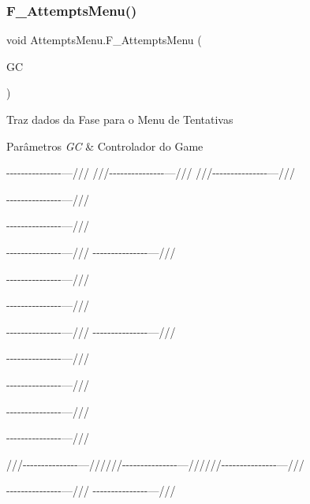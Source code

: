 \mbox{\label{class_attempts_menu_ab12fb99ad5bccf9f8367ef71e17af628}} 
\subsubsection{F\_AttemptsMenu()}
{\footnotesize\ttfamily void Attempts\+Menu.\+F\+\_\+\+Attempts\+Menu (\begin{DoxyParamCaption}\item[{\textbf{ Game\+Controller}}]{GC }\end{DoxyParamCaption})}



Traz dados da Fase para o Menu de Tentativas 


\begin{DoxyParams}{Parâmetros}
{\em GC} & Controlador do Game\\
\hline
\end{DoxyParams}
-\/-\/-\/-\/-\/-\/-\/-\/-\/-\/-\/-\/-\/-\/-\/---/// ///-\/-\/-\/-\/-\/-\/-\/-\/-\/-\/-\/-\/-\/-\/-\/---/// ///-\/-\/-\/-\/-\/-\/-\/-\/-\/-\/-\/-\/-\/-\/-\/---///

-\/-\/-\/-\/-\/-\/-\/-\/-\/-\/-\/-\/-\/-\/-\/---///

-\/-\/-\/-\/-\/-\/-\/-\/-\/-\/-\/-\/-\/-\/-\/---///

-\/-\/-\/-\/-\/-\/-\/-\/-\/-\/-\/-\/-\/-\/-\/---/// -\/-\/-\/-\/-\/-\/-\/-\/-\/-\/-\/-\/-\/-\/-\/---///

-\/-\/-\/-\/-\/-\/-\/-\/-\/-\/-\/-\/-\/-\/-\/---///

-\/-\/-\/-\/-\/-\/-\/-\/-\/-\/-\/-\/-\/-\/-\/---///

-\/-\/-\/-\/-\/-\/-\/-\/-\/-\/-\/-\/-\/-\/-\/---/// -\/-\/-\/-\/-\/-\/-\/-\/-\/-\/-\/-\/-\/-\/-\/---///

-\/-\/-\/-\/-\/-\/-\/-\/-\/-\/-\/-\/-\/-\/-\/---///

-\/-\/-\/-\/-\/-\/-\/-\/-\/-\/-\/-\/-\/-\/-\/---///

-\/-\/-\/-\/-\/-\/-\/-\/-\/-\/-\/-\/-\/-\/-\/---///

-\/-\/-\/-\/-\/-\/-\/-\/-\/-\/-\/-\/-\/-\/-\/---///

///-\/-\/-\/-\/-\/-\/-\/-\/-\/-\/-\/-\/-\/-\/-\/---//////-\/-\/-\/-\/-\/-\/-\/-\/-\/-\/-\/-\/-\/-\/-\/---//////-\/-\/-\/-\/-\/-\/-\/-\/-\/-\/-\/-\/-\/-\/-\/---///

-\/-\/-\/-\/-\/-\/-\/-\/-\/-\/-\/-\/-\/-\/-\/---/// -\/-\/-\/-\/-\/-\/-\/-\/-\/-\/-\/-\/-\/-\/-\/---///

